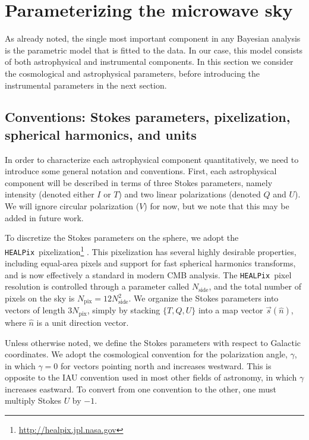 \documentclass[onecolumn]{aa}
\newcommand{\s}[0]{\vec{s}}
\newcommand{\HEALPix}[0]{\texttt{HEALPix}}
\begin{document}
\section{Parameterizing the microwave sky}
\label{sec:sky}

As already noted, the single most important component in any Bayesian
analysis is the parametric model that is fitted to the data. In our
case, this model consists of both astrophysical and instrumental
components. In this section we consider the cosmological and
astrophysical parameters, before introducing the instrumental
parameters in the next section.

\subsection{Conventions: Stokes parameters, pixelization, spherical harmonics, and units}
\label{sec:units}

In order to characterize each astrophysical component quantitatively,
we need to introduce some general notation and conventions. First,
each astrophysical component will be described in terms of three
Stokes parameters, namely intensity (denoted either $I$ or $T$) and
two linear polarizations (denoted $Q$ and $U$). We will ignore
circular polarization ($V$) for now, but we note that this may be
added in future work.

To discretize the Stokes parameters on the sphere, we adopt the
\HEALPix\ pixelization\footnote{\url{http://healpix.jpl.nasa.gov}}
\citep{gorski2005}. This pixelization has several highly desirable
properties, including equal-area pixels and support for fast spherical
harmonics transforms, and is now effectively a standard in modern CMB
analysis. The \HEALPix\ pixel resolution is controlled through a
parameter called $N_{\mathrm{side}}$, and the total number of pixels
on the sky is $N_{\mathrm{pix}}=12N_{\mathrm{side}}^2$. We organize
the Stokes parameters into vectors of length $3N_{\mathrm{pix}}$,
simply by stacking $\{T,Q,U\}$ into a map vector $\s(\hat{n})$, where
$\hat{n}$ is a unit direction vector.

Unless otherwise noted, we define the Stokes parameters with respect
to Galactic coordinates. We adopt the cosmological convention for the
polarization angle, $\gamma$, in which $\gamma=0$ for vectors pointing
north and increases westward. This is opposite to the IAU convention
used in most other fields of astronomy, in which $\gamma$ increases
eastward. To convert from one convention to the other, one must
multiply Stokes $U$ by $-1$.
\end{document}
